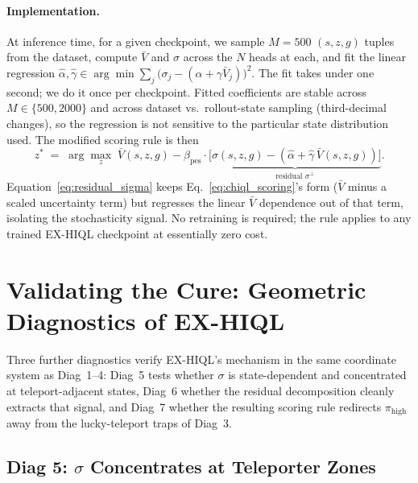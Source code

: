 \documentclass[11pt]{article}
\begin{document}
\paragraph{Implementation.}
At inference time, for a given checkpoint, we sample $M = 500$
$(s,z,g)$ tuples from the dataset, compute $\bar V$ and $\sigma$ across the
$N$ heads at each, and fit the linear regression
$\hat \alpha, \hat \gamma \in \arg\min \sum_j \big(\sigma_j - (\alpha + \gamma \bar V_j)\big)^2$.
The fit takes under one second; we do it once per checkpoint.
Fitted coefficients are stable across $M \in \{500, 2000\}$ and across
dataset vs.\ rollout-state sampling (third-decimal changes), so the
regression is not sensitive to the particular state distribution used.
The modified scoring rule is then
\begin{equation}
  z^* \;=\;
  \arg\max_{z}\;
  \bar V(s,z,g) - \beta_\text{pes}\cdot
      \underbrace{\big[\sigma(s,z,g) - (\hat\alpha + \hat\gamma\,\bar V(s,z,g))\big]}_{\text{residual }\sigma^\perp}.
  \label{eq:residual_sigma}
\end{equation}
Equation~\eqref{eq:residual_sigma} keeps Eq.~\eqref{eq:chiql_scoring}'s
form ($\bar V$ minus a scaled uncertainty term) but regresses the
linear $\bar V$ dependence out of that term, isolating the stochasticity
signal.
No retraining is required; the rule applies to any trained EX-HIQL
checkpoint at essentially zero cost.

\section{Validating the Cure: Geometric Diagnostics of EX-HIQL}
\label{sec:validating}

Three further diagnostics verify EX-HIQL's mechanism in the same
coordinate system as Diag~1--4: Diag~5 tests whether $\sigma$ is
state-dependent and concentrated at teleport-adjacent states,
Diag~6 whether the residual decomposition cleanly extracts that signal,
and Diag~7 whether the resulting scoring rule redirects $\pi_\text{high}$
away from the lucky-teleport traps of Diag~3.

\subsection{Diag 5: $\sigma$ Concentrates at Teleporter Zones}
\label{subsec:diag5}
\end{document}
